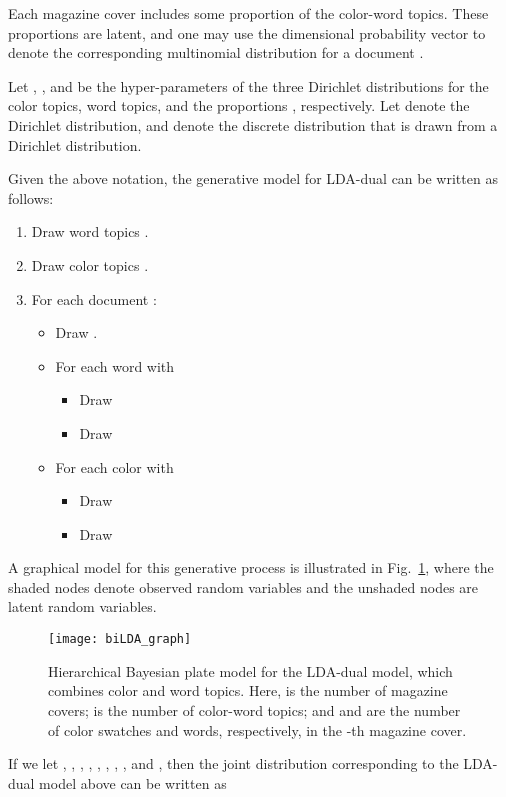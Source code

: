 \documentclass[prodmode,acmtochi]{acmsmall}
\begin{document}
Each magazine cover includes some proportion of the color-word topics.  These
proportions are latent, and one may use the  dimensional probability
vector  to denote the corresponding multinomial distribution
for a document .

Let , , and  be the hyper-parameters of the three Dirichlet distributions for the color topics, word topics, and the proportions , respectively. Let  denote the Dirichlet distribution, and  denote the discrete distribution that is drawn from a Dirichlet distribution.

Given the above notation, the generative model for LDA-dual can be written
as follows:
\begin{enumerate}
\item Draw  word topics .
\item Draw  color topics .
\item For each document :
  \begin{itemize}
  \item Draw .
  \item For each word  with 
    \begin{itemize}
    \item Draw 
    \item Draw 
    \end{itemize}
  \item For each color  with 
    \begin{itemize}
    \item Draw 
    \item Draw 
    \end{itemize}
  \end{itemize}
\end{enumerate}

A graphical model for this generative process is illustrated in
Fig.~\ref{LDAGraph}, where the shaded nodes denote observed random
variables and the unshaded nodes are latent random variables.

\begin{figure}[h!tb]
  \centering
  \texttt{[image: biLDA\_graph]}\caption{Hierarchical Bayesian plate model for the LDA-dual model, which
  combines color and word topics. Here,  is the number of magazine covers;
   is the number of color-word topics; and  and  are the number
  of color swatches and words, respectively, in the -th magazine cover.}
\label{LDAGraph}
\end{figure}

If we let ,
,
, , , ,
, , and , then
the joint distribution corresponding to the LDA-dual model above can be
written as
\end{document}
